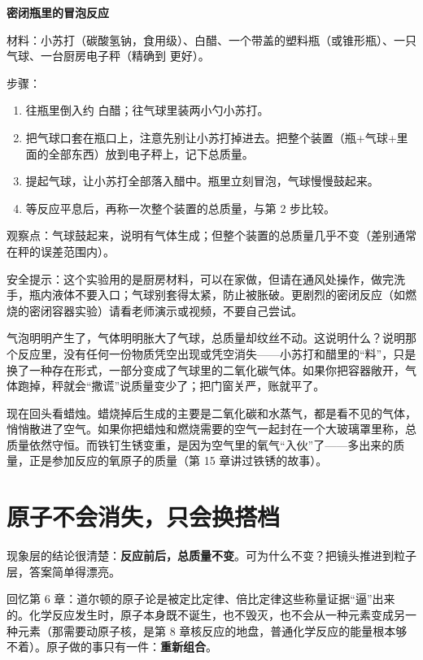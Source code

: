 \begin{shiyan}
\textbf{密闭瓶里的冒泡反应}

材料：小苏打（碳酸氢钠，食用级）、白醋、一个带盖的塑料瓶（或锥形瓶）、一只气球、一台厨房电子秤（精确到  更好）。

步骤：
\begin{enumerate}[itemsep=1pt]
\item 往瓶里倒入约  白醋；往气球里装两小勺小苏打。
\item 把气球口套在瓶口上，注意先别让小苏打掉进去。把整个装置（瓶+气球+里面的全部东西）放到电子秤上，记下总质量。
\item 提起气球，让小苏打全部落入醋中。瓶里立刻冒泡，气球慢慢鼓起来。
\item 等反应平息后，再称一次整个装置的总质量，与第 2 步比较。
\end{enumerate}

观察点：气球鼓起来，说明有气体生成；但整个装置的总质量几乎不变（差别通常在秤的误差范围内）。

安全提示：这个实验用的是厨房材料，可以在家做，但请在通风处操作，做完洗手，瓶内液体不要入口；气球别套得太紧，防止被胀破。更剧烈的密闭反应（如燃烧的密闭容器实验）请看老师演示或视频，不要自己尝试。
\end{shiyan}

气泡明明产生了，气体明明胀大了气球，总质量却纹丝不动。这说明什么？说明那个反应里，没有任何一份物质凭空出现或凭空消失——小苏打和醋里的“料”，只是换了一种存在形式，一部分变成了气球里的二氧化碳气体。如果你把容器敞开，气体跑掉，秤就会“撒谎”说质量变少了；把门窗关严，账就平了。

现在回头看蜡烛。蜡烧掉后生成的主要是二氧化碳和水蒸气，都是看不见的气体，悄悄散进了空气。如果你把蜡烛和燃烧需要的空气一起封在一个大玻璃罩里称，总质量依然守恒。而铁钉生锈变重，是因为空气里的氧气“入伙”了——多出来的质量，正是参加反应的氧原子的质量（第 15 章讲过铁锈的故事）。

\section{原子不会消失，只会换搭档}

现象层的结论很清楚：\textbf{反应前后，总质量不变}。可为什么不变？把镜头推进到粒子层，答案简单得漂亮。

回忆第 6 章：道尔顿的原子论是被定比定律、倍比定律这些称量证据“逼”出来的。化学反应发生时，原子本身既不诞生，也不毁灭，也不会从一种元素变成另一种元素（那需要动原子核，是第 8 章核反应的地盘，普通化学反应的能量根本够不着）。原子做的事只有一件：\textbf{重新组合}。


